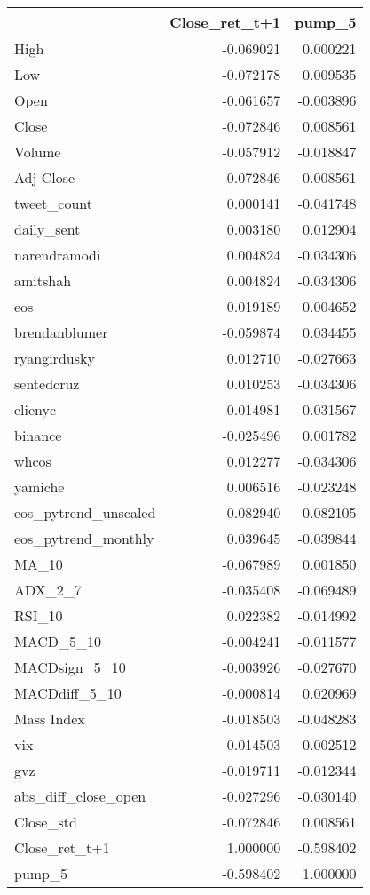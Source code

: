\begin{tabular}{lrr}
\toprule
{} &  Close\_ret\_t+1 &    pump\_5 \\
\midrule
High                 &      -0.069021 &  0.000221 \\
Low                  &      -0.072178 &  0.009535 \\
Open                 &      -0.061657 & -0.003896 \\
Close                &      -0.072846 &  0.008561 \\
Volume               &      -0.057912 & -0.018847 \\
Adj Close            &      -0.072846 &  0.008561 \\
tweet\_count          &       0.000141 & -0.041748 \\
daily\_sent           &       0.003180 &  0.012904 \\
narendramodi         &       0.004824 & -0.034306 \\
amitshah             &       0.004824 & -0.034306 \\
eos                  &       0.019189 &  0.004652 \\
brendanblumer        &      -0.059874 &  0.034455 \\
ryangirdusky         &       0.012710 & -0.027663 \\
sentedcruz           &       0.010253 & -0.034306 \\
elienyc              &       0.014981 & -0.031567 \\
binance              &      -0.025496 &  0.001782 \\
whcos                &       0.012277 & -0.034306 \\
yamiche              &       0.006516 & -0.023248 \\
eos\_pytrend\_unscaled &      -0.082940 &  0.082105 \\
eos\_pytrend\_monthly  &       0.039645 & -0.039844 \\
MA\_10                &      -0.067989 &  0.001850 \\
ADX\_2\_7              &      -0.035408 & -0.069489 \\
RSI\_10               &       0.022382 & -0.014992 \\
MACD\_5\_10            &      -0.004241 & -0.011577 \\
MACDsign\_5\_10        &      -0.003926 & -0.027670 \\
MACDdiff\_5\_10        &      -0.000814 &  0.020969 \\
Mass Index           &      -0.018503 & -0.048283 \\
vix                  &      -0.014503 &  0.002512 \\
gvz                  &      -0.019711 & -0.012344 \\
abs\_diff\_close\_open  &      -0.027296 & -0.030140 \\
Close\_std            &      -0.072846 &  0.008561 \\
Close\_ret\_t+1        &       1.000000 & -0.598402 \\
pump\_5               &      -0.598402 &  1.000000 \\
\bottomrule
\end{tabular}
